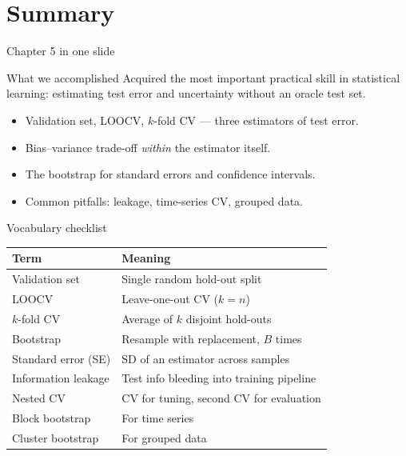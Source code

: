 \documentclass[aspectratio=169,11pt]{beamer}
\begin{document}
\section{Summary}

\begin{frame}{Chapter 5 in one slide}
  \begin{block}{What we accomplished}
    Acquired the most important practical skill in statistical
    learning: estimating test error and uncertainty without an oracle
    test set.
  \end{block}
  \begin{itemize}
    \item Validation set, LOOCV, $k$-fold CV --- three estimators of
          test error.
    \item Bias--variance trade-off \emph{within} the estimator itself.
    \item The bootstrap for standard errors and confidence intervals.
    \item Common pitfalls: leakage, time-series CV, grouped data.
  \end{itemize}
\end{frame}

\begin{frame}{Vocabulary checklist}
  \footnotesize
  \begin{tabular}{ll}
    \toprule
    \textbf{Term} & \textbf{Meaning} \\
    \midrule
    Validation set & Single random hold-out split \\
    LOOCV & Leave-one-out CV ($k = n$) \\
    $k$-fold CV & Average of $k$ disjoint hold-outs \\
    Bootstrap & Resample with replacement, $B$ times \\
    Standard error (SE) & SD of an estimator across samples \\
    Information leakage & Test info bleeding into training pipeline \\
    Nested CV & CV for tuning, second CV for evaluation \\
    Block bootstrap & For time series \\
    Cluster bootstrap & For grouped data \\
    \bottomrule
  \end{tabular}
\end{frame}
\end{document}
